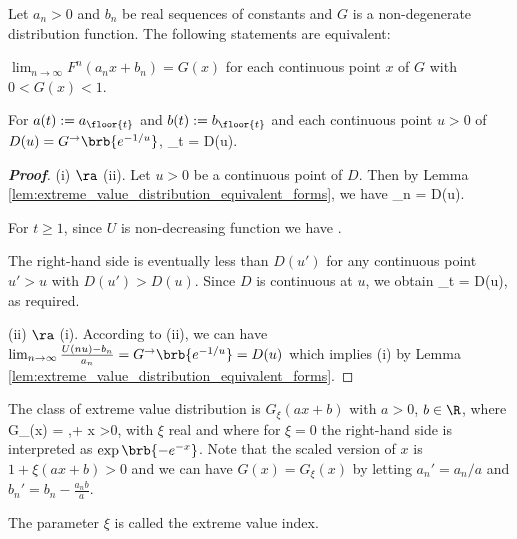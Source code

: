 \begin{lemma}\label{lem:extreme_value_distribution_integer_to_real}
Let $a_n>0$ and $b_n$ be real sequences of constants and $G$ is a non-degenerate distribution function. The following statements are equivalent:
\ben
\item [(i)] $\lim_{n\to\infty} F^n(a_n x + b_n) = G(x)$ for each continuous point $x$ of $G$ with $0<G(x)<1$.
\item [(ii)] For $a(t):= a_{\floor{t}}$ and $b(t) := b_{\floor{t}}$ and each continuous point $u>0$ of $D(u)= G^{\to}\brb{e^{-1/u}}$,
\be
\lim_{t\to\infty}  = D(u).
\ee
\een
\end{lemma}

\begin{proof}[\bf Proof]
(i) $\ra$ (ii). Let $u>0$ be a continuous point of $D$. Then by Lemma \ref{lem:extreme_value_distribution_equivalent_forms}, we have
\be
\lim_{n\to\infty}  = D(u).
\ee

For $t\geq 1$, since $U$ is non-decreasing function we have
\be
{} \leq {} \leq {}.
\ee

The right-hand side is eventually less than $D(u')$ for any continuous point $u'>u$ with $D(u')> D(u)$. Since $D$ is continuous at $u$, we obtain
\be
\lim_{t\to\infty} = D(u),
\ee
as required.

(ii) $\ra$ (i). According to (ii), we can have $\lim_{n\to\infty} \frac{U(nu)-b_n}{a_n} = G^{\to}\brb{e^{-1/u}} = D(u)$ which implies (i) by Lemma \ref{lem:extreme_value_distribution_equivalent_forms}.
\end{proof}


\begin{theorem}\label{thm:extreme_value_theorem}
The class of extreme value distribution is $G_{\xi}(ax+b)$ with $a>0$, $b\in \R$, where
\be
G_{\xi}(x) = \exp{},+ \xi x >0,
\ee
with $\xi$ real and where for $\xi =0$ the right-hand side is interpreted as $\exp\brb{-e^{-x}}$. Note that the scaled version of $x$ is $1+ \xi(ax+b)> 0$ and we can have $G(x) = G_\xi(x)$ by letting $a_n' = a_n/a$ and $b_n' = b_n- \frac{a_n b}{a}$.

The parameter $\xi$ is called the extreme value index.
\end{theorem}

